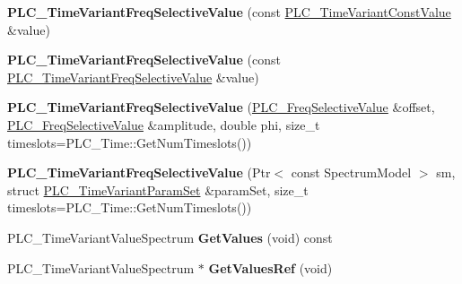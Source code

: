 \begin{DoxyCompactItemize}
\item 
\hypertarget{classns3_1_1PLC__TimeVariantFreqSelectiveValue_a44ce8dd54b8212e62fed3434cbd1cd88}{{\bfseries \-P\-L\-C\-\_\-\-Time\-Variant\-Freq\-Selective\-Value} (const \hyperlink{classns3_1_1PLC__TimeVariantConstValue}{\-P\-L\-C\-\_\-\-Time\-Variant\-Const\-Value} \&value)}\label{classns3_1_1PLC__TimeVariantFreqSelectiveValue_a44ce8dd54b8212e62fed3434cbd1cd88}

\item 
\hypertarget{classns3_1_1PLC__TimeVariantFreqSelectiveValue_aa55a12357efdf99feffe886812240adc}{{\bfseries \-P\-L\-C\-\_\-\-Time\-Variant\-Freq\-Selective\-Value} (const \hyperlink{classns3_1_1PLC__TimeVariantFreqSelectiveValue}{\-P\-L\-C\-\_\-\-Time\-Variant\-Freq\-Selective\-Value} \&value)}\label{classns3_1_1PLC__TimeVariantFreqSelectiveValue_aa55a12357efdf99feffe886812240adc}

\item 
\hypertarget{classns3_1_1PLC__TimeVariantFreqSelectiveValue_a711a1753fd5395f509b634204438008c}{{\bfseries \-P\-L\-C\-\_\-\-Time\-Variant\-Freq\-Selective\-Value} (\hyperlink{classns3_1_1PLC__FreqSelectiveValue}{\-P\-L\-C\-\_\-\-Freq\-Selective\-Value} \&offset, \hyperlink{classns3_1_1PLC__FreqSelectiveValue}{\-P\-L\-C\-\_\-\-Freq\-Selective\-Value} \&amplitude, double phi, size\-\_\-t timeslots=\-P\-L\-C\-\_\-\-Time\-::\-Get\-Num\-Timeslots())}\label{classns3_1_1PLC__TimeVariantFreqSelectiveValue_a711a1753fd5395f509b634204438008c}

\item 
\hypertarget{classns3_1_1PLC__TimeVariantFreqSelectiveValue_afec08ecf9402658a5a192cc34896b46b}{{\bfseries \-P\-L\-C\-\_\-\-Time\-Variant\-Freq\-Selective\-Value} (\-Ptr$<$ const \-Spectrum\-Model $>$ sm, struct \hyperlink{structns3_1_1PLC__TimeVariantFreqSelectiveValue_1_1PLC__TimeVariantParamSet}{\-P\-L\-C\-\_\-\-Time\-Variant\-Param\-Set} \&param\-Set, size\-\_\-t timeslots=\-P\-L\-C\-\_\-\-Time\-::\-Get\-Num\-Timeslots())}\label{classns3_1_1PLC__TimeVariantFreqSelectiveValue_afec08ecf9402658a5a192cc34896b46b}

\item 
\hypertarget{classns3_1_1PLC__TimeVariantFreqSelectiveValue_a513b61be4f5fe39e1b70f2216fcee80d}{\-P\-L\-C\-\_\-\-Time\-Variant\-Value\-Spectrum {\bfseries \-Get\-Values} (void) const }\label{classns3_1_1PLC__TimeVariantFreqSelectiveValue_a513b61be4f5fe39e1b70f2216fcee80d}

\item 
\hypertarget{classns3_1_1PLC__TimeVariantFreqSelectiveValue_aca985f9460a9d9c1fe1d7d2b07999c0e}{\-P\-L\-C\-\_\-\-Time\-Variant\-Value\-Spectrum $\ast$ {\bfseries \-Get\-Values\-Ref} (void)}\label{classns3_1_1PLC__TimeVariantFreqSelectiveValue_aca985f9460a9d9c1fe1d7d2b07999c0e}


\end{DoxyCompactItemize}
